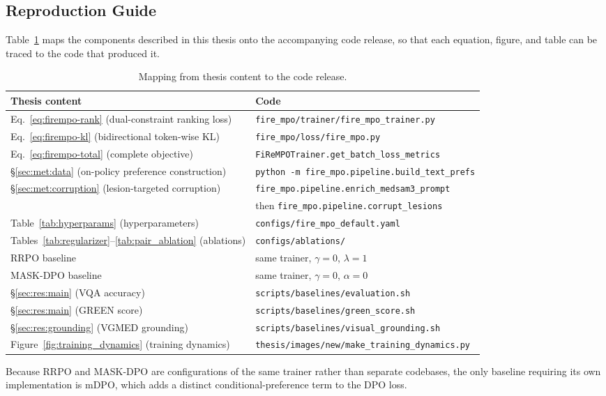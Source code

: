 \clearpage
\subsection{Reproduction Guide}
\label{app:repro}

Table~\ref{tab:repro} maps the components described in this thesis onto the accompanying code release, so that each equation, figure, and table can be traced to the code that produced it.

\begin{table}[ht]
\centering
\small
\caption{Mapping from thesis content to the code release.}
\label{tab:repro}
\begin{tabular}{ll}
\toprule
\textbf{Thesis content} & \textbf{Code} \\
\midrule
Eq.~\ref{eq:firempo-rank} (dual-constraint ranking loss) & \texttt{fire\_mpo/trainer/fire\_mpo\_trainer.py} \\
Eq.~\ref{eq:firempo-kl} (bidirectional token-wise KL) & \texttt{fire\_mpo/loss/fire\_mpo.py} \\
Eq.~\ref{eq:firempo-total} (complete objective) & \texttt{FiReMPOTrainer.get\_batch\_loss\_metrics} \\
\S\ref{sec:met:data} (on-policy preference construction) & \texttt{python -m fire\_mpo.pipeline.build\_text\_prefs} \\
\S\ref{sec:met:corruption} (lesion-targeted corruption) & \texttt{fire\_mpo.pipeline.enrich\_medsam3\_prompt} \\
 & then \texttt{fire\_mpo.pipeline.corrupt\_lesions} \\
Table~\ref{tab:hyperparams} (hyperparameters) & \texttt{configs/fire\_mpo\_default.yaml} \\
Tables~\ref{tab:regularizer}--\ref{tab:pair_ablation} (ablations) & \texttt{configs/ablations/} \\
RRPO baseline & same trainer, $\gamma = 0$, $\lambda = 1$ \\
MASK-DPO baseline & same trainer, $\gamma = 0$, $\alpha = 0$ \\
\S\ref{sec:res:main} (VQA accuracy) & \texttt{scripts/baselines/evaluation.sh} \\
\S\ref{sec:res:main} (GREEN score) & \texttt{scripts/baselines/green\_score.sh} \\
\S\ref{sec:res:grounding} (VGMED grounding) & \texttt{scripts/baselines/visual\_grounding.sh} \\
Figure~\ref{fig:training_dynamics} (training dynamics) & \texttt{thesis/images/new/make\_training\_dynamics.py} \\
\bottomrule
\end{tabular}
\end{table}

Because RRPO and MASK-DPO are configurations of the same trainer rather than separate codebases, the only baseline requiring its own implementation is mDPO, which adds a distinct conditional-preference term to the DPO loss.

